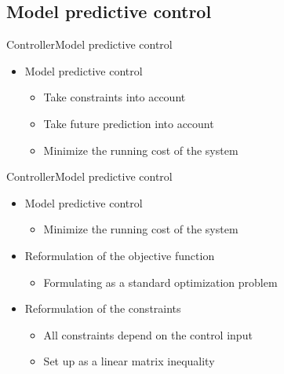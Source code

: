 \subsection{Model predictive control}

\begin{frame}{Controller}{Model predictive control}
\begin{itemize}
	\item<1-> Model predictive control 
	 	\begin{itemize}
	 	\item<1-> Take constraints into account	
	 	\item<1-> Take future prediction into account 
	 	\item<1-> Minimize the running cost of the system
	 	\end{itemize}
\end{itemize}
\end{frame}




\begin{frame}{Controller}{Model predictive control}

\begin{itemize}
	\item<1-> Model predictive control 
	 	\begin{itemize}
	 	\item<1-> Minimize the running cost of the system
	 	\end{itemize}
	\item<2-> Reformulation of the objective function 
	 	\begin{itemize}
	 	\item<2-> Formulating as a standard optimization problem 
	 	\end{itemize}
	\item<3-> Reformulation of the constraints 
	 	\begin{itemize}
	 	\item<3-> All constraints depend on the control input 
	 	\item<3-> Set up as a linear matrix inequality 
	 	\end{itemize}
\end{itemize}
\end{frame}

